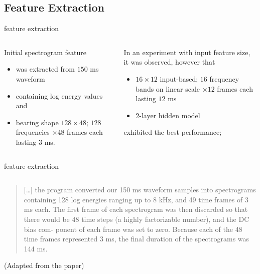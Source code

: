 \documentclass[aspectratio=169,xcolor={dvipsnames,svgnames}]{beamer}
\begin{document}
\subsection{Feature Extraction}
\label{sec:orged96315}

\begin{frame}[label={sec:feature-extraction}]{feature extraction}
\begin{columns}
\begin{column}{.5\columnwidth}
Initial spectrogram feature
\begin{itemize}
\item was extracted from \(150\) ms waveform
\item containing log energy values and
\item bearing shape \(128\times48\); \(128\) frequencies \(\times48\) frames each lasting \(3\) ms.
\end{itemize}
\end{column}


\begin{column}{.5\columnwidth}
In an experiment with input feature size, it was
observed, however that
\begin{itemize}
\item \(16\times12\) input-based; \(16\) frequency bands on
linear scale \(\times12\) frames each lasting \(12\) ms
\item 2-layer hidden model
\end{itemize}
exhibited the best performance; 
\end{column}
\end{columns}
\end{frame}

\begin{frame}[label={sec:orgd279a3d}]{feature extraction}
\begin{columns}
\begin{column}{.7\columnwidth}
\begin{quote}
[\ldots] the program converted our 150 ms waveform samples
into spectrograms containing 128 log energies ranging
up to 8 kHz, and 49 time frames of 3 ms each.  The
first frame of each spectrogram was then discarded so
that there would be 48 time steps (a highly
factorizable number), and the DC bias com- ponent of
each frame was set to zero.  Because each of the 48
time frames represented 3 ms, the final duration of the
spectrograms was 144 ms.
\end{quote}
(Adapted from the paper)
\end{column}
\end{columns}
\end{frame}
\end{document}
